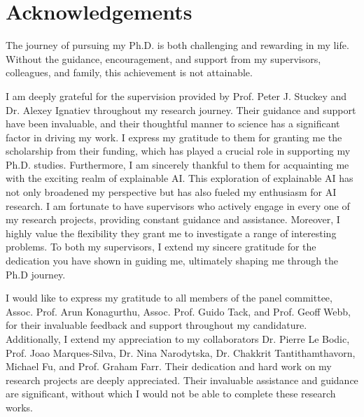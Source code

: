 
\section*{Acknowledgements}

The journey of pursuing my Ph.D. is both challenging and rewarding in my life.
%
Without the guidance, encouragement, and support from my supervisors, colleagues, and family, 
this achievement is not attainable.

I am deeply grateful for the supervision provided by Prof. Peter J. Stuckey and 
Dr. Alexey Ignatiev throughout my research journey.
%
Their guidance and support have been invaluable,  and their thoughtful manner to science
has a significant factor in driving my work.
%
I express my gratitude to them for granting me the scholarship from their funding,
which has played a crucial role in supporting my Ph.D. studies.
%
Furthermore, I am sincerely thankful to them for acquainting me with the exciting
realm of explainable AI.
%
This exploration of explainable AI has not only broadened my perspective
but has also fueled my enthusiasm for AI research.
%
I am fortunate to have supervisors who actively engage in every one of my research projects, 
providing constant guidance and assistance.
%
Moreover, I highly value the flexibility they grant me to investigate a range of interesting
problems.
%
To both my supervisors, I extend my sincere gratitude for the dedication you have 
shown in guiding me, ultimately shaping me through the Ph.D journey.


I would like to express my gratitude to all members of the panel committee, 
Assoc. Prof. Arun Konagurthu, Assoc. Prof. Guido Tack, and Prof. Geoff Webb, 
for their invaluable feedback and support throughout my candidature.
%
%
%
Additionally, I extend my appreciation to my collaborators 
Dr. Pierre Le Bodic, Prof. Joao Marques-Silva,
Dr. Nina Narodytska, Dr. Chakkrit Tantithamthavorn, Michael Fu, and Prof. Graham Farr.
%
Their dedication and hard work on my research projects are deeply appreciated.
%
Their invaluable assistance and guidance are significant, without which I 
would not be able to complete these research works.
%


